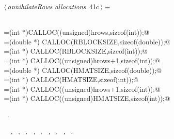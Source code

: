 \documentclass{article}
\begin{document}
\begin{flushleft} \small
\begin{minipage}{\linewidth}\label{scrap54}\raggedright\small
{} $\langle\,${\itshape annihilateRows allocations}\nobreak\ {\footnotesize {41c}}$\,\rangle\equiv$
\vspace{-1ex}
\begin{list}{}{} \item
\mbox{}\verb@@\\
\mbox{}\verb@perm=(int *)CALLOC((unsigned)hrows,sizeof(int));@\\
\mbox{}\verb@rightBlock=(double *) CALLOC(RBLOCKSIZE,sizeof(double));@\\
\mbox{}\verb@rightBlockj=(int *) CALLOC(RBLOCKSIZE,sizeof(int));@\\
\mbox{}\verb@rightBlocki=(int *) CALLOC((unsigned)hrows+1,sizeof(int));@\\
\mbox{}\verb@tempHmat=(double *) CALLOC(HMATSIZE,sizeof(double));@\\
\mbox{}\verb@tempHmatj=(int *) CALLOC(HMATSIZE,sizeof(int));@\\
\mbox{}\verb@tempHmati=(int *) CALLOC((unsigned)hrows+1,sizeof(int));@\\
\mbox{}\verb@iw=(int *) CALLOC((unsigned)HMATSIZE,sizeof(int));@\\
\mbox{}\verb@@{\NWsep}
\end{list}
\vspace{-1.5ex}
\footnotesize
\begin{list}{}{\setlength{\itemsep}{-\parsep}\setlength{\itemindent}{-\leftmargin}}
\item \NWtxtMacroRefIn\ .
\item \NWtxtIdentsUsed\nobreak\  \verb@hrows@\nobreak\ , \verb@iw@\nobreak\ , \verb@perm@\nobreak\ , \verb@rightBlock@\nobreak\ , \verb@rightBlocki@\nobreak\ , \verb@rightBlockj@\nobreak\ , \verb@tempHmat@\nobreak\ , \verb@tempHmati@\nobreak\ , \verb@tempHmatj@\nobreak\ .
\item{}
\end{list}
\end{minipage}\vspace{4ex}
\end{flushleft}
\end{document}
